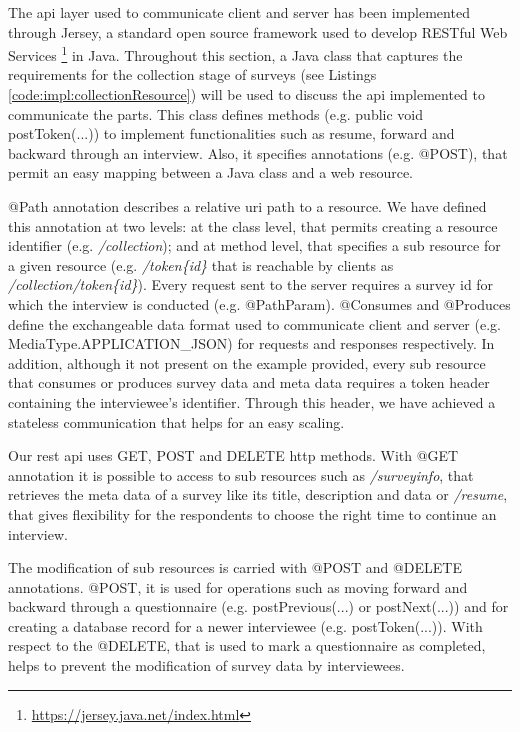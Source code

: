 	The \gls{api} layer used to communicate client and server has been implemented through Jersey, a standard open source framework used to develop RESTful Web Services \footnote{\url{https://jersey.java.net/index.html}} in Java. Throughout this section, a Java class that captures the requirements for the collection stage of surveys (see Listings \ref{code:impl:collectionResource}) will be used to discuss the \gls{api} implemented to communicate the parts. This class defines methods (e.g. public void postToken(...)) to implement functionalities such as resume, forward and backward through an interview. Also, it specifies annotations (e.g. @POST), that permit an easy mapping between a Java class and a web resource.

	

	@Path annotation describes a relative \gls{uri} path to a resource. We have defined this annotation at two levels: at the class level, that permits creating a resource identifier (e.g. \emph{/collection}); and at method level, that specifies a sub resource for a given resource (e.g. \emph{/token\{id\}} that is reachable by clients as \emph{/collection/token\{id\}}). Every request sent to the server requires a survey id for which the interview is conducted (e.g. @PathParam). @Consumes and @Produces define the exchangeable data format used to communicate client and server (e.g. MediaType.APPLICATION\_JSON) for requests and responses respectively. In addition, although it not present on the example provided, every sub resource that consumes or produces survey data and meta data requires a token header containing the interviewee's identifier. Through this header, we have achieved a stateless communication that helps for an easy scaling.

	Our \gls{rest} \gls{api} uses GET, POST and DELETE \gls{http} methods. With @GET annotation it is possible to access to sub resources such as \emph{/surveyinfo}, that retrieves the meta data of a survey like its title, description and data or \emph{/resume}, that gives flexibility for the respondents to choose the right time to continue an interview.

	The modification of sub resources is carried with @POST and @DELETE annotations. @POST, it is used for operations such as moving forward and backward through a questionnaire (e.g. postPrevious(...) or postNext(...)) and for creating a database record for a newer interviewee (e.g. postToken(...)). With respect to the @DELETE, that is used to mark a questionnaire as completed, helps to prevent the modification of survey data by interviewees.